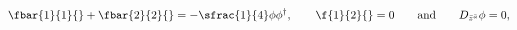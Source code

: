 \begin{equation}\label{rmeq}
 \fbar{1}{1}{}+\fbar{2}{2}{}=-\sfrac{1}{4}\phi\phi^\dagger,\qquad 
 \f{1}{2}{}=0\qquad\text{and}\qquad
  D_{\bar{z}^{\bar{a}}}\phi=0,
\end{equation}

